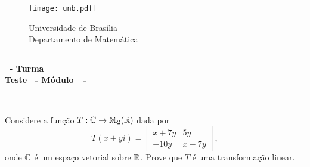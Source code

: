 \documentclass[12pt]{exam}
\begin{document}
    \begin{figure}[h]
        \begin{minipage}[c]{1.7cm}
            \texttt{[image: unb.pdf]}
        \end{minipage}
        \hspace{0pt}
        \begin{minipage}[c]{4in}
            {Universidade de Brasília} \\
            {Departamento de Matemática}
        \end{minipage}
    \end{figure}
    \hrule
    \begin{center}
        {\Large\bf \disciplina\ - Turma \turma}  \\
         {\large\bf Teste \numeroteste\ - Módulo\ \modulo\ -\ \dataavaliacao}
    \end{center}

    \\
    \vspace*{.01cm}

    \vspace{.4cm}

    \questao{}  Considere a função $T : \mathbb{C} \to \mathbb{M}_2(\mathbb{R})$ dada por
  \[
      T(x + yi) = \begin{bmatrix}
                        x + 7y & 5y\\
                       -10y & x - 7y
                   \end{bmatrix},
  \]
    onde $\mathbb{C}$ é um espaço vetorial sobre $\mathbb{R}$. Prove que $T$ é uma transformação linear.
\end{document}

